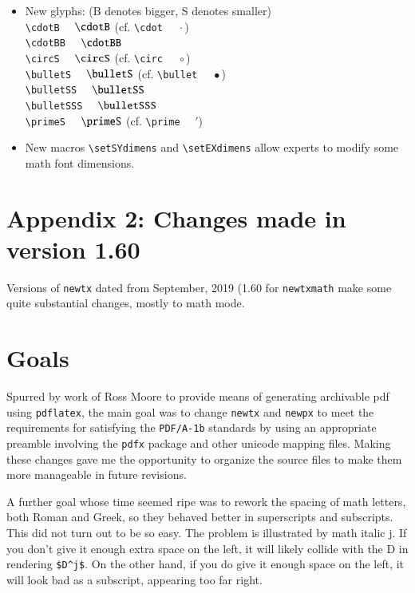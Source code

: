 \documentclass[\fsc]{article}
\theoremstyle{oldplain}
\theoremstyle{plain}
\begin{document}
\begin{itemize}
\verb|\hattilde|$\quad\hattilde{}$\\
\verb|\hathat|$\quad\hathat{}$\\
\item New glyphs: (B denotes bigger, S denotes smaller)\\
\verb|\cdotB| $\quad\cdotB$ (cf. \verb|\cdot| $\quad\cdot$)\\
\verb|\cdotBB| $\quad\cdotBB$\\
\verb|\circS| $\quad\circS$ (cf. \verb|\circ| $\quad\circ$)\\
\verb|\bulletS| $\quad\bulletS$ (cf. \verb|\bullet| $\quad\bullet$)\\
\verb|\bulletSS| $\quad\bulletSS$\\
\verb|\bulletSSS| $\quad\bulletSSS$\\
\verb|\primeS| $\quad\primeS$ (cf. \verb|\prime| $\quad\prime$)\\
\item New macros \verb|\setSYdimens| and \verb|\setEXdimens| allow experts to modify some math font dimensions.
\end{itemize}
\def\jj{\mkern-3mu j}
\section{Appendix 2: Changes made in version 1.60}
Versions of {\tt newtx}  dated from September, 2019 (1.60 for {\tt newtxmath} make some quite substantial changes, mostly to math mode. 
\section{Goals}
Spurred by work of Ross Moore to provide means of generating archivable pdf using {\tt pdflatex}, the main goal was to change {\tt newtx} and {\tt newpx} to meet the requirements for satisfying the {\tt PDF/A-1b} standards by using an appropriate preamble involving the {\tt pdfx} package and other unicode mapping files. Making these  changes  gave me the opportunity to organize the source files to make them more manageable in  future revisions. 

A further goal whose time seemed ripe was to rework the  spacing of math letters, both Roman and Greek, so they behaved better in superscripts and subscripts. This did not turn out to be so easy. The problem is illustrated by math italic j. If you don't give it enough extra space on the left, it will likely collide with the D in rendering \verb|$D^j$|. On the other hand, if you do give it enough space on the left, it will look bad as a  subscript, appearing too far right. 
\end{document}
